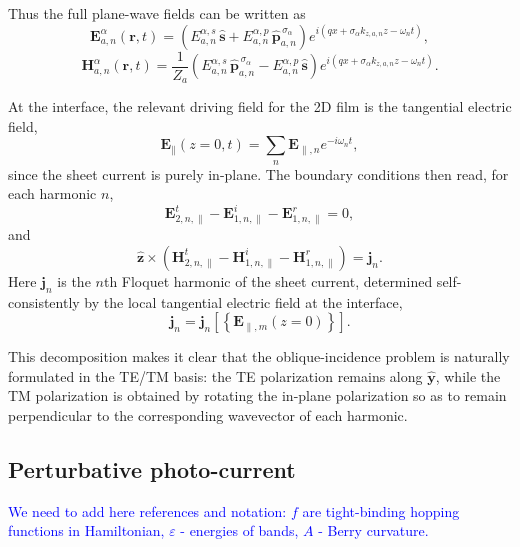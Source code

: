 \documentclass[aps, prb, superscriptaddress, longbibliography]{revtex4-2}
\renewcommand{\epsilon}{\varepsilon}
\newcommand{\addDO}[1]{\textcolor{blue}{#1}}
\numberwithin{equation}{section}
\begin{document}
Thus the full plane-wave fields can be written as
\begin{equation}
\mathbf E^\alpha_{a,n}(\mathbf r,t)
=
\left(
E^{\alpha,s}_{a,n}\,\hat{\mathbf s}
+
E^{\alpha,p}_{a,n}\,\hat{\mathbf p}^{\,\sigma_\alpha}_{a,n}
\right)
e^{i(qx+\sigma_\alpha k_{z,a,n}z-\omega_n t)},
\end{equation}
\begin{equation}
\mathbf H^\alpha_{a,n}(\mathbf r,t)
=
\frac{1}{Z_a}
\left(
E^{\alpha,s}_{a,n}\,\hat{\mathbf p}^{\,\sigma_\alpha}_{a,n}
-
E^{\alpha,p}_{a,n}\,\hat{\mathbf s}
\right)
e^{i(qx+\sigma_\alpha k_{z,a,n}z-\omega_n t)}.
\end{equation}

At the interface, the relevant driving field for the 2D film is the tangential electric field,
\begin{equation}
\mathbf E_{\parallel}(z=0,t)=\sum_n \mathbf E_{\parallel,n} e^{-i\omega_n t},
\end{equation}
since the sheet current is purely in-plane. The boundary conditions then read, for each harmonic $n$,
\begin{equation}
\boxed{
\mathbf E^{t}_{2,n,\parallel}
-
\mathbf E^{i}_{1,n,\parallel}
-
\mathbf E^{r}_{1,n,\parallel}
=0,
}
\end{equation}
and
\begin{equation}
\boxed{
\hat{\mathbf z}\times
\left(
\mathbf H^{t}_{2,n,\parallel}
-
\mathbf H^{i}_{1,n,\parallel}
-
\mathbf H^{r}_{1,n,\parallel}
\right)
=
\mathbf j_n.
}
\end{equation}
Here $\mathbf j_n$ is the $n$th Floquet harmonic of the sheet current, determined self-consistently by the local tangential electric field at the interface,
\begin{equation}
\mathbf j_n=\mathbf j_n\!\left[\left\{\mathbf E_{\parallel,m}(z=0)\right\}\right].
\end{equation}

This decomposition makes it clear that the oblique-incidence problem is naturally formulated in the TE/TM basis: the TE polarization remains along $\hat{\mathbf y}$, while the TM polarization is obtained by rotating the in-plane polarization so as to remain perpendicular to the corresponding wavevector of each harmonic.
\subsection{Perturbative photo-current}
\addDO{We need to add here references and notation: $f$ are tight-binding hopping functions in Hamiltonian, $\epsilon$ - energies of bands, $A$ - Berry curvature.}
\end{document}
